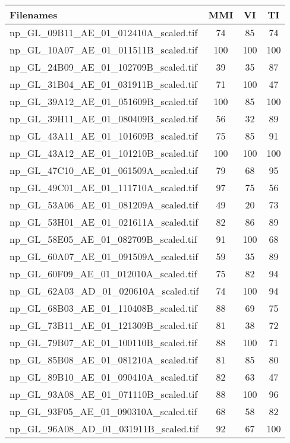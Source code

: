 \begin{tabular}{lccc}
\hline
 Filenames                            & MMI & VI  & TI  \\ \hline \hline
 np\_GL\_09B11\_AE\_01\_012410A\_scaled.tif & 74  & 85  & 74  \\
 np\_GL\_10A07\_AE\_01\_011511B\_scaled.tif & 100 & 100 & 100 \\
 np\_GL\_24B09\_AE\_01\_102709B\_scaled.tif & 39  & 35  & 87  \\
 np\_GL\_31B04\_AE\_01\_031911B\_scaled.tif & 71  & 100 & 47  \\
 np\_GL\_39A12\_AE\_01\_051609B\_scaled.tif & 100 & 85  & 100 \\
 np\_GL\_39H11\_AE\_01\_080409B\_scaled.tif & 56  & 32  & 89  \\
 np\_GL\_43A11\_AE\_01\_101609B\_scaled.tif & 75  & 85  & 91  \\
 np\_GL\_43A12\_AE\_01\_101210B\_scaled.tif & 100 & 100 & 100 \\
 np\_GL\_47C10\_AE\_01\_061509A\_scaled.tif & 79  & 68  & 95  \\
 np\_GL\_49C01\_AE\_01\_111710A\_scaled.tif & 97  & 75  & 56  \\
 np\_GL\_53A06\_AE\_01\_081209A\_scaled.tif & 49  & 20  & 73  \\
 np\_GL\_53H01\_AE\_01\_021611A\_scaled.tif & 82  & 86  & 89  \\
 np\_GL\_58E05\_AE\_01\_082709B\_scaled.tif & 91  & 100 & 68  \\
 np\_GL\_60A07\_AE\_01\_091509A\_scaled.tif & 59  & 35  & 89  \\
 np\_GL\_60F09\_AE\_01\_012010A\_scaled.tif & 75  & 82  & 94  \\
 np\_GL\_62A03\_AD\_01\_020610A\_scaled.tif & 74  & 100 & 94  \\
 np\_GL\_68B03\_AE\_01\_110408B\_scaled.tif & 88  & 69  & 75  \\
 np\_GL\_73B11\_AE\_01\_121309B\_scaled.tif & 81  & 38  & 72  \\
 np\_GL\_79B07\_AE\_01\_100110B\_scaled.tif & 88  & 100 & 71  \\
 np\_GL\_85B08\_AE\_01\_081210A\_scaled.tif & 81  & 85  & 80  \\
 np\_GL\_89B10\_AE\_01\_090410A\_scaled.tif & 82  & 63  & 47  \\
 np\_GL\_93A08\_AE\_01\_071110B\_scaled.tif & 88  & 100 & 96  \\
 np\_GL\_93F05\_AE\_01\_090310A\_scaled.tif & 68  & 58  & 82  \\
 np\_GL\_96A08\_AD\_01\_031911B\_scaled.tif & 92  & 67  & 100 \\
\hline
\end{tabular}